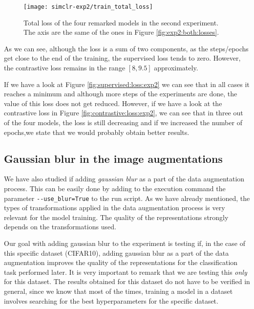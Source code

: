 \begin{figure}[H]
\centering
\texttt{[image: simclr-exp2/train\_total\_loss]}%
\caption{Total loss of the four remarked models in the second experiment. The axis are the same of the ones in Figure \ref{fig:exp2:both:losses}. }
\label{fig:total:loss:exp2}%
\end{figure}

As we can see, although the loss is a sum of two components, as the steps/epochs get close to the end of the training, the supervised loss tends to zero. However, the contrastive loss remains in the range $[8,9.5]$ approximately. 

If we have a look at Figure \ref{fig:supervised:loss:exp2} we can see that in all cases it reaches a minimum and although more steps of the experiments are done, the value of this loss does not get reduced. However, if we have a look at the contrastive loss in Figure \ref{fig:contrastive:loss:exp2}, we can see that in three out of the four models, the loss is still decreasing and if we increased the number of epochs,we state that we would probably obtain better results.

\subsection{Gaussian blur in the image augmentations}
\label{exp3:adding:blur}

We have also studied if adding \emph{gaussian blur} as a part of the data augmentation process. This can be easily done by adding to the execution command the parameter \lstinline{--use_blur=True} to the run script. As we have already mentioned, the types of transformations applied in the data augmentation process is very relevant for the model training. The quality of the representations strongly depends on the transformations used.

Our goal with adding gaussian blur to the experiment is testing if, in the case of this specific dataset (CIFAR10), adding gaussian blur as a part of the data augmentation improves the quality of the representations for the classification task performed later. It is very important to remark that we are testing this \emph{only} for this dataset. The results obtained for this dataset do not have to be verified in general, since we know that most of the times, training a model in a dataset involves searching for the best hyperparameters for the specific dataset.

